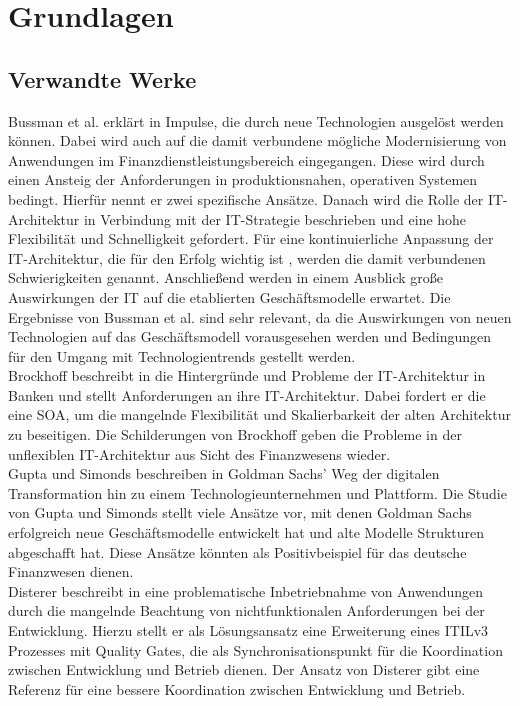 \chapter{Grundlagen}
\label{chapter:grundlagen}

\section{Verwandte Werke}
Bussman et al. erklärt in \cite{Bussmann2006} Impulse, die durch neue Technologien ausgelöst werden können. Dabei wird auch auf die damit verbundene mögliche Modernisierung von Anwendungen im Finanzdienstleistungsbereich eingegangen. Diese wird durch einen Ansteig der Anforderungen in produktionsnahen, operativen Systemen \cite{Bussmann2006, Brockhoff2006} bedingt. Hierfür nennt er zwei spezifische Ansätze. Danach wird die Rolle der IT-Architektur in Verbindung mit der IT-Strategie beschrieben und eine hohe Flexibilität und Schnelligkeit gefordert. Für eine kontinuierliche Anpassung der IT-Architektur, die für den Erfolg wichtig ist \cite{Bussmann2006}, werden die damit verbundenen Schwierigkeiten genannt. Anschließend werden in einem Ausblick große Auswirkungen der IT auf die etablierten Geschäftsmodelle erwartet. Die Ergebnisse von Bussman et al. sind sehr relevant, da die Auswirkungen von neuen Technologien auf das Geschäftsmodell vorausgesehen werden und Bedingungen für den Umgang mit Technologientrends gestellt werden.
\medskip
\\
Brockhoff beschreibt in \cite{Brockhoff2006} die Hintergründe und Probleme der IT-Architektur in Banken und stellt Anforderungen an ihre IT-Architektur. Dabei fordert er die eine \ac{SOA}, um die mangelnde Flexibilität und Skalierbarkeit der alten Architektur zu beseitigen. Die Schilderungen von Brockhoff geben die Probleme in der unflexiblen IT-Architektur aus Sicht des Finanzwesens wieder.
\medskip
\\
Gupta und Simonds beschreiben in \cite{Gupta:2017} Goldman Sachs' Weg der digitalen Transformation hin zu einem Technologieunternehmen und Plattform. 
Die Studie von Gupta und Simonds stellt viele Ansätze vor, mit denen Goldman Sachs erfolgreich neue Geschäftsmodelle entwickelt hat und alte Modelle Strukturen abgeschafft hat. Diese Ansätze könnten als Positivbeispiel für das deutsche Finanzwesen dienen.
\medskip
\\
Disterer beschreibt in \cite{mci/Disterer2011} eine problematische Inbetriebnahme von Anwendungen durch die mangelnde Beachtung von nichtfunktionalen Anforderungen bei der Entwicklung. Hierzu stellt er als Lösungsansatz eine Erweiterung eines ITILv3 Prozesses mit Quality Gates, die als Synchronisationspunkt für die Koordination zwischen Entwicklung und Betrieb dienen. Der Ansatz von Disterer gibt eine Referenz für eine bessere Koordination zwischen Entwicklung und Betrieb.
